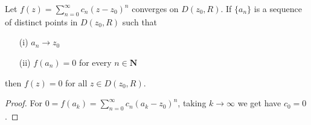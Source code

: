 \vspace{2ex}
\begin{thm}
Let $f(z)=\sum ^{\infty }_{n=0}c_{n}(z-z_0)^{n}$ converges on $D(z_0,R)$. If $\{a_{n}\}$ is a sequence of distinct points in $D(z_0,R)$ such that 
\begin{itemize}
\item[(i)] $a_{n}\rightarrow z_0$
\item[(ii)] $f(a_{n})=0$ for every $n\in {\bm N}$
\end{itemize}
then $f(z)=0$ for all $z\in D(z_0,R)$. 
\end{thm}
\vspace{2ex}
\begin{proof}
For $0=f(a_{k})=\sum ^{\infty }_{n=0}c_{n}(a_{k}-z_0)^{n}$, taking $k\rightarrow \infty $ we get have $c_0=0$. 
\end{proof}
\vspace{2ex}


